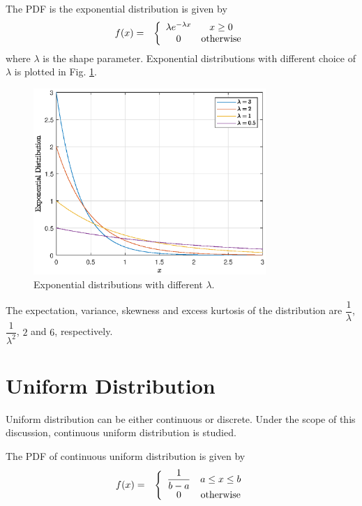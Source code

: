 The PDF is the exponential distribution is given by
\begin{eqnarray}
	f(x) &=& \left\{\begin{array}{cc}
		\lambda e^{-\lambda x} & x \geq 0 \\
		0 & \textup{otherwise}
	\end{array}\right. \label{eq:exponential_pdf}
\end{eqnarray}
where $\lambda$ is the shape parameter. Exponential distributions with different choice of $\lambda$ is plotted in Fig. \ref{fig:exponential}.
\begin{figure}
	\centering
	\includegraphics[width=250pt]{chapters/ch-commonly-seen-distributions/figs/exponential_pdf.eps}
	\caption{Exponential distributions with different $\lambda$.} \label{fig:exponential}
\end{figure}

The expectation, variance, skewness and excess kurtosis of the distribution are $\dfrac{1}{\lambda}$, $\dfrac{1}{\lambda^2}$, $2$ and $6$, respectively.

\section{Uniform Distribution}

Uniform distribution can be either continuous or discrete. Under the scope of this discussion, continuous uniform distribution is studied.

The PDF of continuous uniform distribution is given by
\begin{eqnarray}
  f(x) &=& \left\{\begin{array}{cc}
                    \dfrac{1}{b-a} & a \leq x \leq b \\
                    0 & \textup{otherwise}
                  \end{array}\right. \nonumber
\end{eqnarray}

